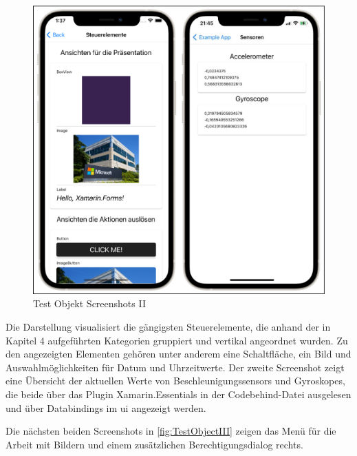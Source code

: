 \begin{figure}[!ht]
 \includegraphics[width=\textwidth,keepaspectratio]{Images/Screenshot/Sensors.png}
 \caption{Test Objekt Screenshots II}
 \label{fig:TestObjectII}
\end{figure}
Die Darstellung visualisiert die gängigsten Steuerelemente,  die anhand der in Kapitel 4 aufgeführten Kategorien gruppiert und vertikal angeordnet wurden.  Zu den angezeigten Elementen gehören unter anderem eine Schaltfläche,  ein Bild und Auswahlmöglichkeiten für Datum und Uhrzeitwerte.  Der zweite Screenshot zeigt eine Übersicht der aktuellen Werte von Beschleunigungssensors und  Gyroskopes,  die beide über das Plugin Xamarin.Essentials in der Codebehind-Datei ausgelesen und über Databindings im \ac{ui} angezeigt werden.    

Die nächsten beiden Screenshots in \ref{fig:TestObjectIII} zeigen das Menü für die Arbeit mit Bildern und einem zusätzlichen Berechtigungsdialog rechts.

